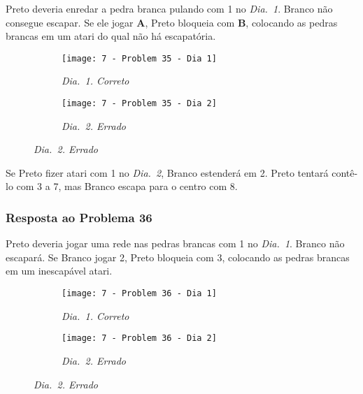 Preto deveria enredar a pedra branca pulando com 1 no \emph{Dia.\@~1}. Branco não consegue escapar. Se ele jogar \textbf{A}, Preto bloqueia com \textbf{B}, colocando as pedras brancas em um atari do qual não há escapatória.

\begin{figure}[h!]
    \centering
    \begin{subfigure}[t]{.425\textwidth}
        \texttt{[image: 7 - Problem 35 - Dia 1]}
        \captionsetup{justification=centering}
        \caption*{\emph{Dia.\@~1. Correto}}
    \end{subfigure}
    \hspace{1cm}
    \begin{subfigure}[t]{.425\textwidth}
        \texttt{[image: 7 - Problem 35 - Dia 2]}
        \captionsetup{justification=centering}
        \caption*{\emph{Dia.\@~2. Errado}}
    \end{subfigure}
\end{figure}

Se Preto fizer atari com 1 no \emph{Dia.\@~2}, Branco estenderá em 2. Preto tentará contê-lo com 3 a 7, mas Branco escapa para o centro com 8.

\pagebreak

\subsubsection*{Resposta ao Problema 36}

Preto deveria jogar uma rede nas pedras brancas com 1 no \emph{Dia.\@~1}. Branco não escapará. Se Branco jogar 2, Preto bloqueia com 3, colocando as pedras brancas em um inescapável atari.

\begin{figure}[h!]
    \centering
    \begin{subfigure}[t]{.425\textwidth}
        \texttt{[image: 7 - Problem 36 - Dia 1]}
        \captionsetup{justification=centering}
        \caption*{\emph{Dia.\@~1. Correto}}
    \end{subfigure}
    \hspace{1cm}
    \begin{subfigure}[t]{.425\textwidth}
        \texttt{[image: 7 - Problem 36 - Dia 2]}
        \captionsetup{justification=centering}
        \caption*{\emph{Dia.\@~2. Errado}}
    \end{subfigure}
\end{figure}

